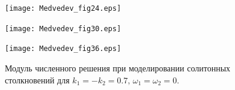 \documentclass[12pt,a4paper]{article}
\begin{document}
\begin{figure}[H]
		\begin{minipage}[h]{0.32\linewidth}
			\texttt{[image: Medvedev\_fig24.eps]}
		\end{minipage}
		\begin{minipage}[h]{0.32\linewidth}
			\texttt{[image: Medvedev\_fig30.eps]}
		\end{minipage}
		\begin{minipage}[h]{0.32\linewidth}
			\texttt{[image: Medvedev\_fig36.eps]}
		\end{minipage}
		\caption{Модуль численного решения при моделировании солитонных столкновений для \(k_{1}=-k_{2}=0.7,\,\omega_{1}=\omega_{2}=0\).}
		\label{fig50}
	\end{figure}
\end{document}
